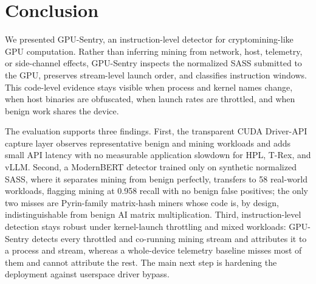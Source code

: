 \section{Conclusion}
\label{sec:conclusion}

We presented GPU-Sentry, an instruction-level detector for cryptomining-like GPU computation. Rather than inferring mining from network, host, telemetry, or side-channel effects, GPU-Sentry inspects the normalized SASS submitted to the GPU, preserves stream-level launch order, and classifies instruction windows. This code-level evidence stays visible when process and kernel names change, when host binaries are obfuscated, when launch rates are throttled, and when benign work shares the device.

The evaluation supports three findings. First, the transparent CUDA Driver-API capture layer observes representative benign and mining workloads and adds small API latency with no measurable application slowdown for HPL, T-Rex, and vLLM. Second, a ModernBERT detector trained only on synthetic normalized SASS, where it separates mining from benign perfectly, transfers to 58 real-world workloads, flagging mining at 0.958 recall with no benign false positives; the only two misses are Pyrin-family matrix-hash miners whose code is, by design, indistinguishable from benign AI matrix multiplication. Third, instruction-level detection stays robust under kernel-launch throttling and mixed workloads: GPU-Sentry detects every throttled and co-running mining stream and attributes it to a process and stream, whereas a whole-device telemetry baseline misses most of them and cannot attribute the rest. The main next step is hardening the deployment against userspace driver bypass.
